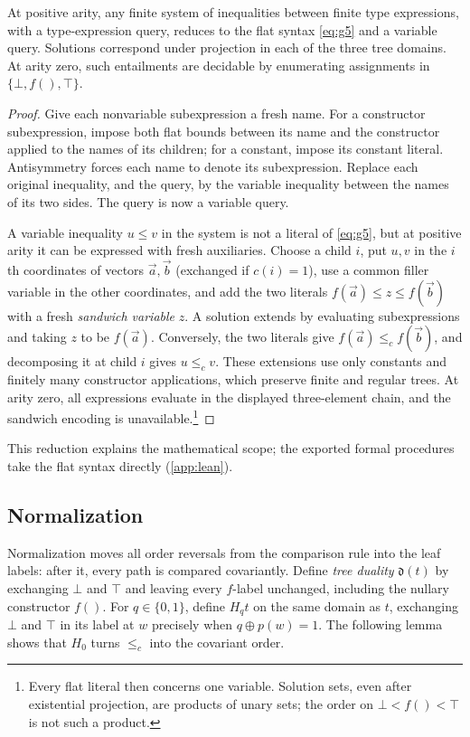 \begin{proposition}[Flattening]\label{prop:flattening}
At positive arity, any finite system of inequalities between finite type
expressions, with a type-expression query, reduces to the flat syntax
\eqref{eq:g5} and a variable query. Solutions correspond under projection
in each of the three tree domains. At arity zero, such entailments are
decidable by enumerating assignments in $\{\bot,f(),\top\}$.
\end{proposition}
\begin{proof}
Give each nonvariable subexpression a fresh name. For a constructor
subexpression, impose both flat bounds between its name and the constructor
applied to the names of its children; for a constant, impose its constant
literal. Antisymmetry forces each name to denote its subexpression.
Replace each original inequality, and the query, by the variable inequality
between the names of its two sides. The query is now a variable query.

A variable inequality $u\le v$ in the system is not a literal of
\eqref{eq:g5}, but at positive arity it can be expressed with fresh
auxiliaries. Choose a child $i$, put $u,v$ in the $i$th coordinates of
vectors $\vec a,\vec b$ (exchanged if $c(i)=1$), use a common filler
variable in the other coordinates, and add the two literals
$f(\vec a)\le z\le f(\vec b)$ with a fresh \emph{sandwich variable} $z$.
A solution extends by evaluating subexpressions and taking $z$ to be
$f(\vec a)$. Conversely, the two literals give $f(\vec a)\le_c f(\vec b)$,
and decomposing it at child $i$ gives $u\le_c v$.
These extensions use only constants and finitely many constructor
applications, which preserve finite and regular trees. At arity zero, all
expressions evaluate in the displayed three-element chain, and the sandwich
encoding is unavailable.\footnote{Every flat literal
then concerns one variable. Solution sets, even after existential projection,
are products of unary sets; the order on $\bot<f()<\top$ is not such a product.}
\end{proof}
This reduction explains the mathematical scope; the exported formal
procedures take the flat syntax directly (\cref{app:lean}).

\subsection{Normalization}\label{sec:normal}
Normalization moves all order reversals from the comparison rule into the
leaf labels: after it, every path is compared covariantly.
Define \emph{tree duality} $\mathfrak d(t)$ by exchanging $\bot$ and
$\top$ and leaving every $f$-label unchanged, including the nullary
constructor $f()$. For $q\in\{0,1\}$, define $H_qt$ on the same domain as
$t$, exchanging $\bot$ and $\top$ in its label at $w$ precisely when
$q\oplus p(w)=1$. The following lemma shows that $H_0$ turns $\le_c$ into
the covariant order.

